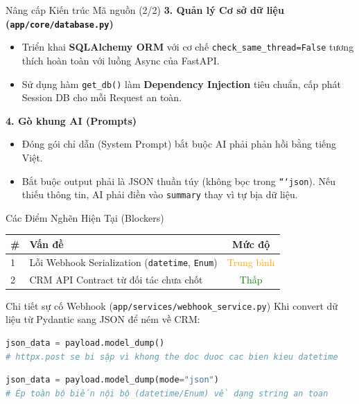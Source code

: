 \begin{frame}{Nâng cấp Kiến trúc Mã nguồn (2/2)}
    \textbf{3. Quản lý Cơ sở dữ liệu (\texttt{app/core/database.py})}
    \begin{itemize}
        \item Triển khai \textbf{SQLAlchemy ORM} với cơ chế \texttt{check\_same\_thread=False} tương thích hoàn toàn với luồng Async của FastAPI.
        \item Sử dụng hàm \texttt{get\_db()} làm \textbf{Dependency Injection} tiêu chuẩn, cấp phát Session DB cho mỗi Request an toàn.
    \end{itemize}
    
    \vspace{0.2cm}
    \textbf{4. Gò khung AI (Prompts)}
    \begin{itemize}
        \item Đóng gói chỉ dẫn (System Prompt) bắt buộc AI phải phản hồi bằng tiếng Việt.
        \item Bắt buộc output phải là JSON thuần túy (không bọc trong \texttt{```json}). Nếu thiếu thông tin, AI phải điền vào \texttt{summary} thay vì tự bịa dữ liệu.
    \end{itemize}
\end{frame}

\begin{frame}[fragile]{Các Điểm Nghẽn Hiện Tại (Blockers)}
    \begin{table}[]
        \centering
        \begin{tabular}{|l|p{7.5cm}|c|}
            \hline
            \textbf{\#} & \textbf{Vấn đề} & \textbf{Mức độ} \\ \hline
            1 & Lỗi Webhook Serialization (\texttt{datetime}, \texttt{Enum}) & \textcolor{orange}{Trung bình} \\ \hline
            2 & CRM API Contract từ đối tác chưa chốt & \textcolor{green}{Thấp} \\ \hline
        \end{tabular}
    \end{table}

    \vspace{0.2cm}
    \begin{block}{Chi tiết sự cố Webhook (\texttt{app/services/webhook\_service.py})}
        Khi convert dữ liệu từ Pydantic sang JSON để ném về CRM:
        \begin{lstlisting}[language=python, basicstyle=\tiny, title=Code hiện tại (Lỗi)]
json_data = payload.model_dump()
# httpx.post se bi sập vì khong the doc duoc cac bien kieu datetime
        \end{lstlisting}
        \begin{lstlisting}[language=python, basicstyle=\tiny, title=Khắc phục (Đề xuất)]
json_data = payload.model_dump(mode="json") 
# Ép toàn bộ biến nội bộ (datetime/Enum) về dạng string an toan
        \end{lstlisting}
    \end{block}
\end{frame}

